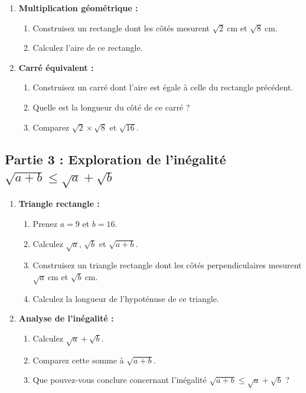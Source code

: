\documentclass{article}
\begin{document}
\begin{enumerate}
    \item \textbf{Multiplication géométrique :}
    \begin{enumerate}
        \item Construisez un rectangle dont les côtés mesurent $\sqrt{2}~\text{cm}$ et $\sqrt{8}~\text{cm}$.
        \item Calculez l'aire de ce rectangle.
    \end{enumerate}
    \item \textbf{Carré équivalent :}
    \begin{enumerate}
        \item Construisez un carré dont l'aire est égale à celle du rectangle précédent.
        \item Quelle est la longueur du côté de ce carré ?
        \item Comparez $\sqrt{2} \times \sqrt{8}$ et $\sqrt{16}$.
    \end{enumerate}
\end{enumerate}

\subsection*{Partie 3 : Exploration de l'inégalité $\sqrt{a + b} \leq \sqrt{a} + \sqrt{b}$}

\begin{enumerate}
    \item \textbf{Triangle rectangle :}
    \begin{enumerate}
        \item Prenez $a = 9$ et $b = 16$.
        \item Calculez $\sqrt{a}$, $\sqrt{b}$ et $\sqrt{a + b}$.
        \item Construisez un triangle rectangle dont les côtés perpendiculaires mesurent $\sqrt{a}~\text{cm}$ et $\sqrt{b}~\text{cm}$.
        \item Calculez la longueur de l'hypoténuse de ce triangle.
    \end{enumerate}
    \item \textbf{Analyse de l'inégalité :}
    \begin{enumerate}
        \item Calculez $\sqrt{a} + \sqrt{b}$.
        \item Comparez cette somme à $\sqrt{a + b}$.
        \item Que pouvez-vous conclure concernant l'inégalité $\sqrt{a + b} \leq \sqrt{a} + \sqrt{b}$ ?
    \end{enumerate}
\end{enumerate}
\end{document}
